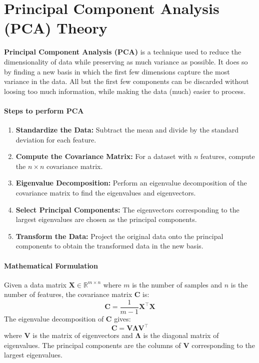 \documentclass[]{article}
\begin{document}
	\section{Principal Component Analysis (PCA) Theory}
	\textbf{Principal Component Analysis (PCA)} is a technique used to reduce the dimensionality of data while preserving as much variance as possible.
	It does so by finding a new basis in which the first few dimensions capture the most variance in the data.
	All but the first few components can be discarded without loosing too much information, while making the data (much) easier to process.
	
	\paragraph{Steps to perform PCA}
	\begin{enumerate}
		\item \textbf{Standardize the Data:}
		Subtract the mean and divide by the standard deviation for each feature.
		\item \textbf{Compute the Covariance Matrix:}
		For a dataset with $n$ features, compute the $n \times n$ covariance matrix.
		\item \textbf{Eigenvalue Decomposition:}
		Perform an eigenvalue decomposition of the covariance matrix to find the eigenvalues and eigenvectors.
		\item \textbf{Select Principal Components:}
		The eigenvectors corresponding to the largest eigenvalues are chosen as the principal components.
		\item \textbf{Transform the Data:}
		Project the original data onto the principal components to obtain the transformed data in the new basis.
	\end{enumerate}
	
	\paragraph{Mathematical Formulation}
	Given a data matrix $\mathbf{X} \in \mathbb{R}^{m \times n}$ where $m$ is the number of samples and $n$ is the number of features, the covariance matrix $\mathbf{C}$ is:
	$$
	\mathbf{C} = \frac{1}{m-1} \mathbf{X}^\top \mathbf{X}
	$$
	The eigenvalue decomposition of $\mathbf{C}$ gives:
	$$
	\mathbf{C} = \mathbf{V} \mathbf{\Lambda} \mathbf{V}^\top
	$$
	where $\mathbf{V}$ is the matrix of eigenvectors and $\mathbf{\Lambda}$ is the diagonal matrix of eigenvalues.
	The principal components are the columns of $\mathbf{V}$ corresponding to the largest eigenvalues.
	
\end{document}
